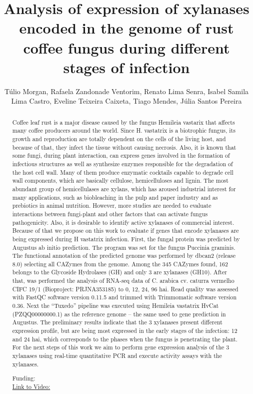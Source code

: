 \documentclass[twoside]{article}
\title{\vspace{-15mm}\fontsize{24pt}{10pt}\selectfont\textbf{ Analysis of expression of xylanases encoded in the genome of rust coffee fungus during different stages of infection }} %
\author{ T\'ulio Morgan,  Rafaela Zandonade Ventorim,  Renato Lima Senra,  Isabel Samila Lima Castro,  Eveline Teixeira Caixeta,  Tiago Mendes,  J\'ulia Santos Pereira }
\affil{ UNIVERSIDADE FEDERAL DE VI\c{C}OSA,  UNIVERSIDADE FEDERAL DE MINAS GERAIS,  UNIVERSIDADE FEDERAL DE VI\c{C}OSA,  UFV - UNIVERSIDADE FEDERAL DE VI\c{C}OSA campus Vi\c{c}osa,  Ufv }
\date{}
\begin{document}
  
  
  \maketitle %
  
  
  \thispagestyle{fancy} %
  
  
  \begin{abstract}
  Coffee leaf rust is a major disease caused by the fungus Hemileia vastarix that affects many coffee producers around the world. Since H. vastatrix is a biotrophic fungus,  its growth and reproduction are totally dependent on the cells of the living host,  and because of that,  they infect the tissue without causing necrosis. Also,  it is known that some fungi,  during plant interaction,  can express genes involved in the formation of infectious structures as well as synthesize enzymes responsible for the degradation of the host cell wall. Many of them produce enzymatic cocktails capable to degrade cell wall components,  which are basically cellulose,  hemicelluloses and lignin. The most abundant group of hemicellulases are xylans,  which has aroused industrial interest for many applications,  such as biobleaching in the pulp and paper industry and as prebiotics in animal nutrition. However,  more studies are needed to evaluate interactions between fungi-plant and other factors that can activate fungus pathogenicity. Also,  it is desirable to identify active xylanases of commercial interest. Because of that we propose on this work to evaluate if genes that encode xylanases are being expressed during H vastatrix infection. First,  the fungal protein was predicted by Augustus ab initio prediction. The program was set for the fungus Puccinia graminis. The functional annotation of the predicted genome was performed by dbcan2 (release 8.0) selecting all CAZymes from the genome. Among the 345 CAZymes found,  162 belongs to the Glycoside Hydrolases (GH) and only 3 are xylanases (GH10). After that,  was performed the analysis of RNA-seq data of C. arabica cv. caturra vermelho CIFC 19/1 (Bioproject: PRJNA353185) to 0,  12,  24,  96 hai. Read quality was assessed with FastQC software version 0.11.5 and trimmed with Trimmomatic software version 0.36. Next the “Tuxedo” pipeline was executed using Hemileia vastatrix HvCat (PZQQ00000000.1) as the reference genome – the same used to gene prediction in Augustus. The preliminary results indicate that the 3 xylanases present different expression profile,  but are being most expressed in the early stages of the infection: 12 and 24 hai,  which corresponds to the phases when the fungus is penetrating the plant. For the next steps of this work we aim to perform gene expression analysis of the 3 xylanases using real-time quantitative PCR and execute activity assays with the xylanases.
  
  Funding:   \\
  \href{http://ab3c.org.br/xpress_pres2020/xmxp2020-298059.html}{Link to Video:}

  \end{abstract}
   
  
\end{document}
